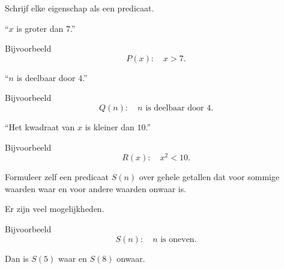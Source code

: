 \documentclass{ximera}
\begin{document}
\begin{oefening}{\oefB \ESS}

Schrijf elke eigenschap als een predicaat.

\begin{question}
``$x$ is groter dan $7$.''

\begin{oplossing}
Bijvoorbeeld
\[
P(x):\quad x>7.
\]
\end{oplossing}
\end{question}


\begin{question}
``$n$ is deelbaar door $4$.''

\begin{oplossing}
Bijvoorbeeld
\[
Q(n):\quad n\text{ is deelbaar door }4.
\]
\end{oplossing}
\end{question}


\begin{question}
``Het kwadraat van $x$ is kleiner dan $10$.''

\begin{oplossing}
Bijvoorbeeld
\[
R(x):\quad x^2<10.
\]
\end{oplossing}
\end{question}


\begin{question}
Formuleer zelf een predicaat $S(n)$ over gehele getallen dat voor
sommige waarden waar en voor andere waarden onwaar is.

\begin{oplossing}
Er zijn veel mogelijkheden.

Bijvoorbeeld
\[
S(n):\quad n\text{ is oneven}.
\]

Dan is $S(5)$ waar en $S(8)$ onwaar.
\end{oplossing}
\end{question}

\end{oefening}
\end{document}

